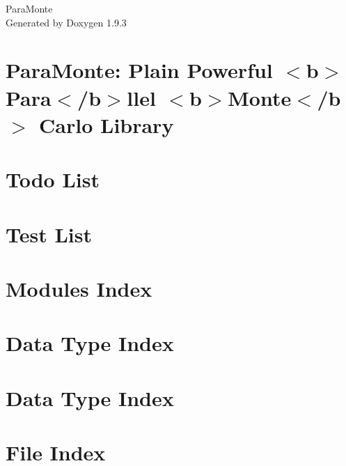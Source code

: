 \documentclass[twoside]{book}
\newcommand{\+}{\discretionary{\mbox{\scriptsize$\hookleftarrow$}}{}{}}
\newcommand{\clearemptydoublepage}{%
    \newpage{\pagestyle{empty}\cleardoublepage}%
  }
\begin{document}
  \raggedbottom
    \hypersetup{pageanchor=false,
                bookmarksnumbered=true,
                pdfencoding=unicode
               }
  \begin{titlepage}
  \vspace*{7cm}
  \begin{center}%
  {\Large Para\+Monte}\\
  \vspace*{1cm}
  {\large Generated by Doxygen 1.9.3}\\
  \end{center}
  \end{titlepage}
  \clearemptydoublepage
  \tableofcontents
  \clearemptydoublepage
  \hypersetup{pageanchor=true}
\chapter{Para\+Monte\+: Plain Powerful \texorpdfstring{$<$}{<}b\texorpdfstring{$>$}{>}Para\texorpdfstring{$<$}{<}/b\texorpdfstring{$>$}{>}llel \texorpdfstring{$<$}{<}b\texorpdfstring{$>$}{>}Monte\texorpdfstring{$<$}{<}/b\texorpdfstring{$>$}{>} Carlo Library}
\label{index}\hypertarget{index}{}
\chapter{Todo List}
\label{todo}

\chapter{Test List}
\label{test}

\chapter{Modules Index}

\chapter{Data Type Index}

\chapter{Data Type Index}

\chapter{File Index}

\end{document}
